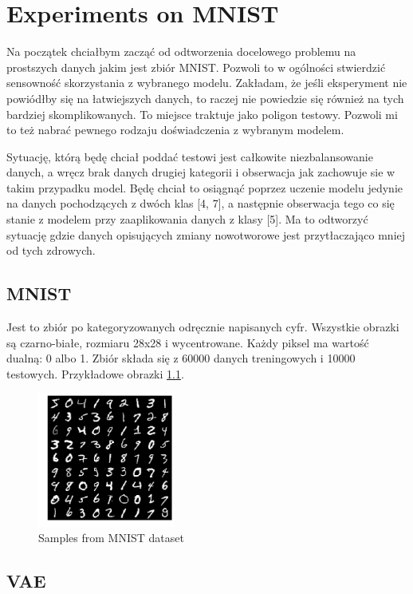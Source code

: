 \chapter{Experiments on MNIST}

Na początek chciałbym zacząć od odtworzenia docelowego problemu na prostszych danych jakim jest zbiór MNIST. Pozwoli to w ogólności stwierdzić sensowność skorzystania z wybranego modelu. Zakładam, że jeśli eksperyment nie powiódłby się na łatwiejszych danych, to raczej nie powiedzie się również na tych bardziej skomplikowanych. To miejsce traktuje jako poligon testowy. Pozwoli mi to też nabrać pewnego rodzaju doświadczenia z wybranym modelem.

Sytuację, którą będę chciał poddać testowi jest całkowite niezbalansowanie danych, a wręcz brak danych drugiej kategorii i obserwacja jak zachowuje sie w takim przypadku model. Będę chciał to osiągnąć poprzez uczenie modelu jedynie na danych pochodzących z dwóch klas [4, 7], a następnie obserwacja tego co się stanie z modelem przy zaaplikowania danych z klasy [5]. Ma to odtworzyć sytuację gdzie danych opisujących zmiany nowotworowe jest przytłaczająco mniej od tych zdrowych.

\section{MNIST}

Jest to zbiór po kategoryzowanych odręcznie napisanych cyfr. Wszystkie obrazki są czarno-białe, rozmiaru 28x28 i wycentrowane. Każdy piksel ma wartość dualną: 0 albo 1. Zbiór składa się z 60000 danych treningowych i 10000 testowych. Przykładowe obrazki \ref{fig:mnist}.

\begin{figure}[h!]
    \centering
    \includegraphics[width=0.4\textwidth]{images/mnist}
    \caption{Samples from MNIST dataset}
    \label{fig:mnist}
\end{figure}

\section{VAE}


